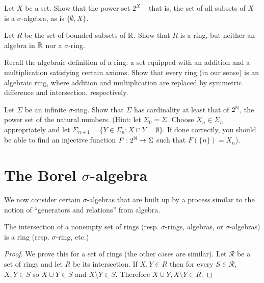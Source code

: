 \begin{exercise}
Let $X$ be a set.
Show that the power set $2^X$ -- that is, the set of all subsets of $X$ -- is a $\sigma$-algebra, as is $\{\emptyset, X\}$.
\end{exercise}

\begin{exercise}
Let $R$ be the set of bounded subsets of $\mathbb{R}$.
Show that $R$ is a ring, but neither an algebra in $\mathbb{R}$ nor a $\sigma$-ring.
\end{exercise}

\begin{exercise}
Recall the algebraic definition of a ring: a set equipped with an addition and a multiplication satisfying certain axioms.
Show that every ring (in our sense) is an algebraic ring, where addition and multiplication are replaced by symmetric difference and intersection, respectively.
\end{exercise}

\begin{exercise}
Let $\Sigma$ be an infinite $\sigma$-ring. Show that $\Sigma$ has cardinality at least that of $2^{\mathbb{N}}$, the power set of the natural numbers.
(Hint: let $\Sigma_0 = \Sigma$. Choose $X_{n} \in \Sigma_{n}$ appropriately and let $\Sigma_{n+1} = \{Y \in \Sigma_{n}: X \cap Y = \emptyset\}$. If done correctly, you should be able to find an injective function $F: 2^{\mathbb{N}} \to \Sigma$ such that $F(\{n\}) = X_{n}$).
\end{exercise}

\section{The Borel $\sigma$-algebra}
We now consider certain $\sigma$-algebras that are built up by a process similar to the notion of ``generators and relations'' from algebra.

\begin{lemma}
\label{intersection of rings is ring}
The intersection of a nonempty set of rings (resp. $\sigma$-rings, algebras, or $\sigma$-algebras) is a ring (resp. $\sigma$-ring, etc.)
\end{lemma}
\begin{proof}
We prove this for a set of rings (the other cases are similar). Let $\mathcal R$ be a set of rings and let $R$ be its intersection.
If $X, Y \in R$ then for every $S \in \mathcal R$, $X, Y \in S$ so $X \cup Y \in S$ and $X \setminus Y \in S$.
Therefore $X \cup Y, X \setminus Y \in R$.
\end{proof}

